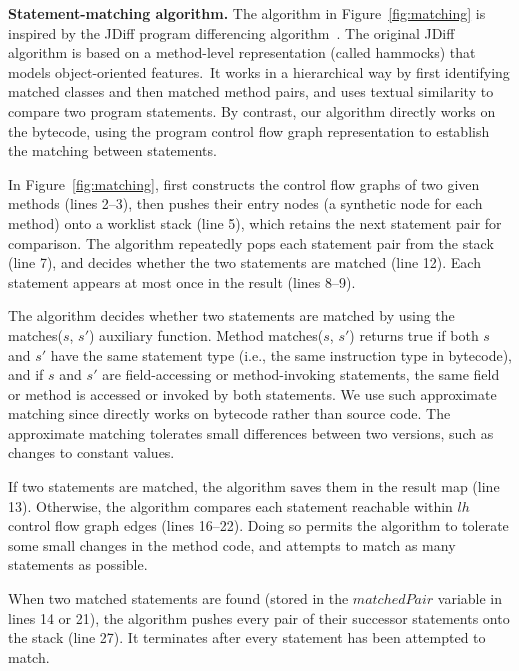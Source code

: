 \vspace{1mm}
\noindent \textbf{Statement-matching algorithm.}
The algorithm in Figure~\ref{fig:matching} is inspired by
the JDiff program differencing algorithm~\cite{Apiwattanapong:2004}. The original JDiff
algorithm is based on a method-level representation
(called hammocks) that models object-oriented features.\
It works in a hierarchical way by first identifying matched
classes and then matched method pairs, and uses
textual similarity to compare two program statements. By contrast, our
algorithm directly works on the bytecode, using the program control flow graph
representation to establish the matching between statements.

In Figure~\ref{fig:matching}, \ourtool first constructs the control
flow graphs of two given methods (lines 2--3), then pushes their
entry nodes (a synthetic node for each method) onto a worklist stack (line 5), which retains
the next statement pair for comparison. The algorithm repeatedly
pops each statement pair from the stack (line 7), and
decides whether the two statements are matched (line 12).  
Each statement appears at most once in the result (lines 8--9).

The algorithm decides whether two statements are matched by using
the matches($\mathit{s}$, $\mathit{s'}$) auxiliary function. Method
matches($\mathit{s}$, $\mathit{s'}$) returns true if both
$\mathit{s}$ and $\mathit{s'}$ have the same statement type (i.e.,
the same instruction type in bytecode), and if $\mathit{s}$ and
$\mathit{s'}$ are field-accessing or method-invoking statements,
the same field or method is accessed or invoked
by both statements.
We use such approximate matching since \ourtool directly works
on bytecode rather than source code. The approximate matching
tolerates small differences
between two versions, such as changes to constant values.


If two statements are matched, the algorithm saves them in the
result map (line 13). Otherwise,
the algorithm compares each statement reachable within $lh$
control flow graph edges (lines 16--22). Doing so permits the algorithm to tolerate some small
changes in the method code, and attempts to match as many statements as possible.

When two matched statements are found  (stored in
the $\mathit{matchedPair}$ variable in lines 14 or 21),
the algorithm pushes every pair of
their successor statements onto the stack (line 27).
It terminates after every statement has been attempted to match.


